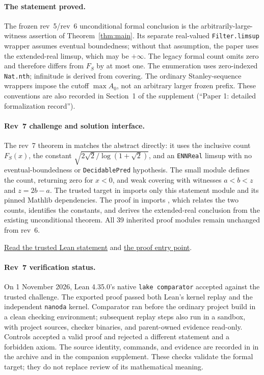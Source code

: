 \documentclass[11pt]{article}
\theoremstyle{definition}\newtheorem{definition}[theorem]{Definition}
\theoremstyle{remark}\newtheorem{remark}[theorem]{Remark}
\numberwithin{equation}{section}
\begin{document}
\paragraph{The statement proved.}
The frozen rev~5/rev~6 unconditional formal conclusion is the arbitrarily-large-witness assertion of Theorem~\ref{thm:main}. Its separate real-valued \texttt{Filter.limsup} wrapper assumes eventual boundedness; without that assumption, the paper uses the extended-real limsup, which may be $+\infty$. The legacy formal count omits zero and therefore differs from $F_S$ by at most one. The enumeration uses zero-indexed \texttt{Nat.nth}; infinitude is derived from covering. The ordinary Stanley-sequence wrappers impose the cutoff $\max A_0$, not an arbitrary larger frozen prefix. These conventions are also recorded in Section~1 of the supplement (``Paper 1: detailed formalization record'').

\paragraph{Rev~7 challenge and solution interface.}
The rev~7 theorem  in  matches the abstract directly: it uses the inclusive count $F_S(x)$, the constant $\sqrt{2\sqrt2/\log(1+\sqrt2)}$, and an \texttt{ENNReal} limsup with no eventual-boundedness or \texttt{DecidablePred} hypothesis. The small  module defines the count, returning zero for $x<0$, and weak covering with witnesses $a<b<z$ and $z=2b-a$. The trusted target in  imports only this statement module and its pinned Mathlib dependencies. The proof in  imports , which relates the two counts, identifies the constants, and derives the extended-real conclusion from the existing unconditional theorem. All 39 inherited proof modules remain unchanged from rev~6.

\noindent\href{https://github.com/Dlgt-io/room-math-results/blob/main/results/erdos-271/lean/rev7/Challenge.lean}{Read the trusted Lean statement} and \href{https://github.com/Dlgt-io/room-math-results/blob/main/results/erdos-271/lean/rev7/Solution.lean}{the proof entry point}.

\paragraph{Rev~7 verification status.}
On 1 November 2026, Lean 4.35.0's native \texttt{lake comparator} accepted  against the trusted challenge. The exported proof passed both Lean's kernel replay and the independent \texttt{nanoda} kernel. Comparator ran before the ordinary project build in a clean checking environment; subsequent replay steps also run in a sandbox, with project sources, checker binaries, and parent-owned evidence read-only. Controls accepted a valid proof and rejected a different statement and a forbidden axiom. The source identity, commands, and evidence are recorded in  in the archive and in the companion supplement. These checks validate the formal target; they do not replace review of its mathematical meaning.
\end{document}
